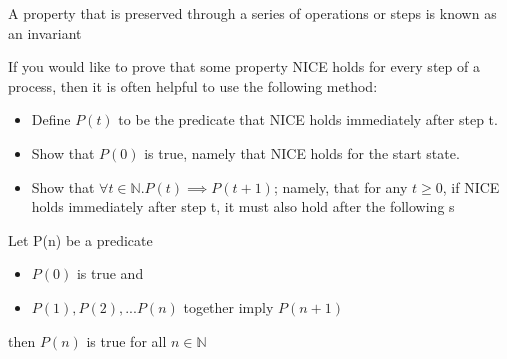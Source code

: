 \begin{definition}[Invariant]
	A property that is preserved through a series of operations or steps is known as an
	invariant
\end{definition}


\begin{lemma}
	If you would like to prove that some property NICE holds for every
	step of a process, then it is often helpful to use the following method:
	\begin{itemize}
		\item Define $P(t)$ to be the predicate that NICE holds immediately after step t.
		\item Show that $P(0)$ is true, namely that NICE holds for the start state.	
		\item Show that
		$\forall t \in \mathbb{N}. P(t) \implies P(t + 1)$;
		namely, that for any $t \ge 0$, if NICE holds immediately after step t, it must
		also hold after the following s
	\end{itemize}
\end{lemma}

\begin{definition}
	Let P(n) be a predicate
	\begin{itemize}
		\item $P(0)$ is true and 
		\item $P(1), P(2), ... P(n)$ together imply $P(n+1)$ 
	\end{itemize}
	then $P(n)$ is true for all $n \in \mathbb{N}$
\end{definition}
